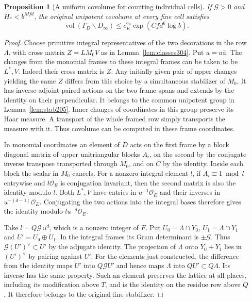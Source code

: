 \documentclass[a4paper,11pt]{article}
\newtheorem{proposition}{Proposition}[section]
\theoremstyle{definition}
\theoremstyle{remark}
\numberwithin{equation}{section}
\newcommand{\OO}{\mathcal O}
\begin{document}
\begin{proposition}[A uniform covolume for counting individual cells]\leavevmode
\label{prop:covol304}
If \(\mathcal G>0\) and \(H_*<b^{Mfd}\), the original
unipotent covolume at every fine cell satisfies
\[
    \operatorname{vol}(\Gamma_D\backslash D_\infty)
                         \le c_E^{a_0}\exp(Cfd^6\log b).
\]
\end{proposition}
\begin{proof}
Choose primitive integral representatives of the two
decorations in the row \(\Lambda\), with cross matrix
\(Z=L M_0 V\) as in Lemma~\ref{lem:classes304}. Put
\(u=a\bar a\). The changes from the monomial frames to
these integral frames can be taken to be \(L^*,V\).
Indeed their cross matrix is \(Z\). Any initially given
pair of upper changes yielding the same \(Z\) differs
from this choice by a simultaneous stabilizer of \(M_0\).
It has inverse-adjoint paired actions on the two frame
spans and extends by the identity on their perpendicular.
It belongs to the common unipotent group in
Lemma~\ref{lem:stab205}. Inner changes of coordinates in
this group preserve its Haar measure. A transport of the
whole framed row simply transports the measure with it.
Thus covolume can be computed in these frame coordinates.

In monomial coordinates an element of \(D\) acts on the
first frame by a block diagonal matrix of upper unitriangular
blocks \(A_i\), on the second by the conjugate inverse
transpose transported through \(M_0\), and on \(C\) by the
identity. Inside each block the scalar in \(M_0\) cancels.
For a nonzero integral element \(l\), if \(A_i\equiv1\bmod l\)
entrywise and \(l\OO_E\) is conjugation invariant, then
the second matrix is also the identity modulo \(l\).
Both \(L^*,V\) have entries in \(u^{-1}\OO_E\) and their
inverses in \(u^{-(d-1)}\OO_E\). Conjugating the two actions
into the integral bases therefore gives the identity
modulo \(l u^{-d}\OO_E\).

Take \(l=Q\mathcal G\,u^d\), which is a nonzero integer
of \(F\). Put \(U_0=\Lambda\cap Y_0,\ U_1=\Lambda\cap Y_1\)
and \(U'=U_0\oplus U_1\). In the integral frames its Gram
determinant is \(\pm\mathcal G\). Thus \(\mathcal G(U')^\vee
\subset U'\) by the adjugate identity. The projection of
\(\Lambda\) onto \(Y_0+Y_1\) lies in \((U')^\vee\) by
pairing against \(U'\). For the elements just constructed,
the difference from the identity maps \(U'\) into
\(Q\mathcal G U'\) and hence maps \(\Lambda\) into
\(Q U'\subset Q\Lambda\). Its inverse has the same
property. Such an element preserves the lattice at
all places, including its modification above \(T\), and
is the identity on the residue row above \(Q\). It
therefore belongs to the original fine stabilizer.


\end{proof}
\end{document}
